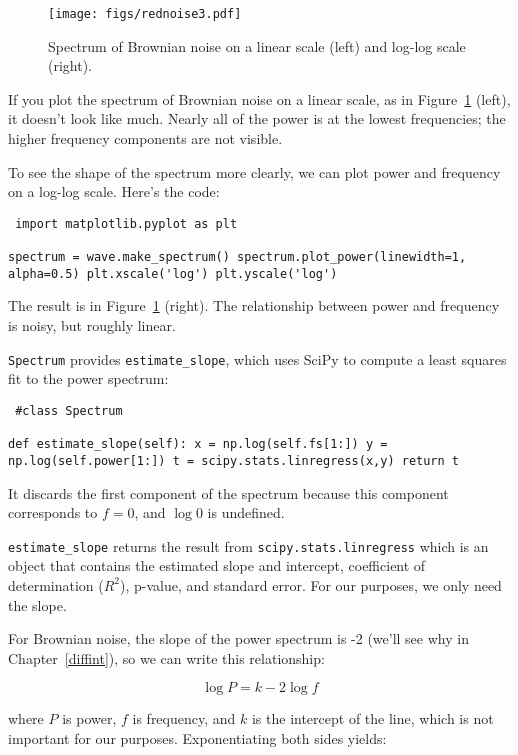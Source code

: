 \documentclass[12pt]{book} \usepackage[width=5.5in,height=8.5in, hmarginratio=3:2,vmarginratio=1:1]{geometry}
\begin{document}
\begin{figure} 

\centerline{\texttt{[image: figs/rednoise3.pdf]}} \caption{Spectrum of Brownian noise on a linear scale (left) and log-log scale (right).} \label{fig.rednoise3} \end{figure} 

If you plot the spectrum of Brownian noise on a linear scale, as in Figure~\ref{fig.rednoise3} (left), it doesn't look like much. Nearly all of the power is at the lowest frequencies; the higher frequency components are not visible. 

To see the shape of the spectrum more clearly, we can plot power and frequency on a log-log scale. Here's the code: 

\begin{verbatim} import matplotlib.pyplot as plt 

spectrum = wave.make_spectrum() spectrum.plot_power(linewidth=1, alpha=0.5) plt.xscale('log') plt.yscale('log') \end{verbatim} 

The result is in Figure~\ref{fig.rednoise3} (right). The relationship between power and frequency is noisy, but roughly linear. 

{\tt Spectrum} provides \verb"estimate_slope", which uses SciPy to compute a least squares fit to the power spectrum: 

\begin{verbatim} #class Spectrum 

def estimate_slope(self): x = np.log(self.fs[1:]) y = np.log(self.power[1:]) t = scipy.stats.linregress(x,y) return t \end{verbatim} 

It discards the first component of the spectrum because this component corresponds to $f=0$, and $\log 0$ is undefined. 

\verb"estimate_slope" returns the result from {\tt scipy.stats.linregress} which is an object that contains the estimated slope and intercept, coefficient of determination ($R^2$), p-value, and standard error. For our purposes, we only need the slope. 

For Brownian noise, the slope of the power spectrum is -2 (we'll see why in Chapter~\ref{diffint}), so we can write this relationship: 

%
\[ \log P = k -2 \log f \] 

%
where $P$ is power, $f$ is frequency, and $k$ is the intercept of the line, which is not important for our purposes. Exponentiating both sides yields: 
\end{document}

